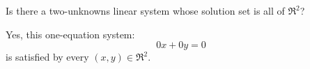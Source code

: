 \index{}


\begin{Exercise}[
name={},
title={}, 
difficulty=0,
origin={\cite{JH}}]
Is there a two-unknowns
linear system whose solution set is all of \( \Re^2 \)?
\end{Exercise}

\begin{Answer}
Yes, this one-equation system:
\begin{equation*}
0x+0y=0
\end{equation*}
is satisfied by every \( (x,y)\in\Re^2 \). 
\end{Answer}
